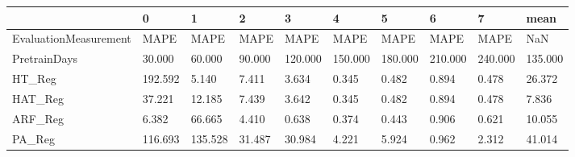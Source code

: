 \begin{tabular}{llllllllll}
\toprule
{} &       0 &       1 &      2 &       3 &       4 &       5 &       6 &       7 &    mean \\
\midrule
EvaluationMeasurement &    MAPE &    MAPE &   MAPE &    MAPE &    MAPE &    MAPE &    MAPE &    MAPE &     NaN \\
PretrainDays          &  30.000 &  60.000 & 90.000 & 120.000 & 150.000 & 180.000 & 210.000 & 240.000 & 135.000 \\
HT\_Reg                & 192.592 &   5.140 &  7.411 &   3.634 &   0.345 &   0.482 &   0.894 &   0.478 &  26.372 \\
HAT\_Reg               &  37.221 &  12.185 &  7.439 &   3.642 &   0.345 &   0.482 &   0.894 &   0.478 &   7.836 \\
ARF\_Reg               &   6.382 &  66.665 &  4.410 &   0.638 &   0.374 &   0.443 &   0.906 &   0.621 &  10.055 \\
PA\_Reg                & 116.693 & 135.528 & 31.487 &  30.984 &   4.221 &   5.924 &   0.962 &   2.312 &  41.014 \\
\bottomrule
\end{tabular}
